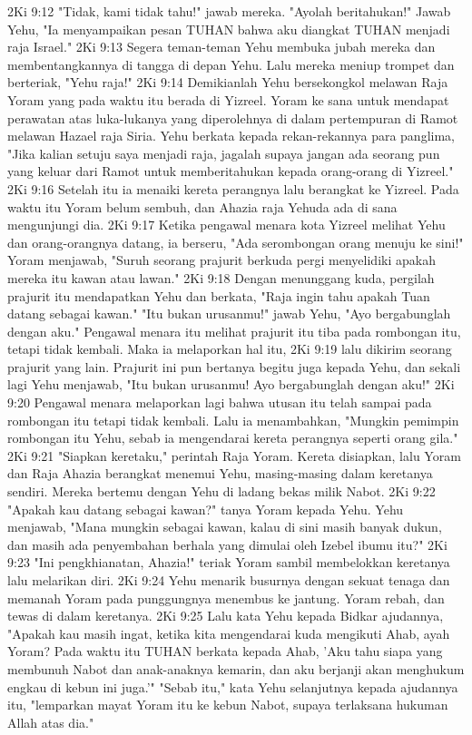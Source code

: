 2Ki 9:12  "Tidak, kami tidak tahu!" jawab mereka. "Ayolah beritahukan!" Jawab Yehu, "Ia menyampaikan pesan TUHAN bahwa aku diangkat TUHAN menjadi raja Israel."
2Ki 9:13  Segera teman-teman Yehu membuka jubah mereka dan membentangkannya di tangga di depan Yehu. Lalu mereka meniup trompet dan berteriak, "Yehu raja!"
2Ki 9:14  Demikianlah Yehu bersekongkol melawan Raja Yoram yang pada waktu itu berada di Yizreel. Yoram ke sana untuk mendapat perawatan atas luka-lukanya yang diperolehnya di dalam pertempuran di Ramot melawan Hazael raja Siria. Yehu berkata kepada rekan-rekannya para panglima, "Jika kalian setuju saya menjadi raja, jagalah supaya jangan ada seorang pun yang keluar dari Ramot untuk memberitahukan kepada orang-orang di Yizreel."
2Ki 9:16  Setelah itu ia menaiki kereta perangnya lalu berangkat ke Yizreel. Pada waktu itu Yoram belum sembuh, dan Ahazia raja Yehuda ada di sana mengunjungi dia.
2Ki 9:17  Ketika pengawal menara kota Yizreel melihat Yehu dan orang-orangnya datang, ia berseru, "Ada serombongan orang menuju ke sini!" Yoram menjawab, "Suruh seorang prajurit berkuda pergi menyelidiki apakah mereka itu kawan atau lawan."
2Ki 9:18  Dengan menunggang kuda, pergilah prajurit itu mendapatkan Yehu dan berkata, "Raja ingin tahu apakah Tuan datang sebagai kawan." "Itu bukan urusanmu!" jawab Yehu, "Ayo bergabunglah dengan aku." Pengawal menara itu melihat prajurit itu tiba pada rombongan itu, tetapi tidak kembali. Maka ia melaporkan hal itu,
2Ki 9:19  lalu dikirim seorang prajurit yang lain. Prajurit ini pun bertanya begitu juga kepada Yehu, dan sekali lagi Yehu menjawab, "Itu bukan urusanmu! Ayo bergabunglah dengan aku!"
2Ki 9:20  Pengawal menara melaporkan lagi bahwa utusan itu telah sampai pada rombongan itu tetapi tidak kembali. Lalu ia menambahkan, "Mungkin pemimpin rombongan itu Yehu, sebab ia mengendarai kereta perangnya seperti orang gila."
2Ki 9:21  "Siapkan keretaku," perintah Raja Yoram. Kereta disiapkan, lalu Yoram dan Raja Ahazia berangkat menemui Yehu, masing-masing dalam keretanya sendiri. Mereka bertemu dengan Yehu di ladang bekas milik Nabot.
2Ki 9:22  "Apakah kau datang sebagai kawan?" tanya Yoram kepada Yehu. Yehu menjawab, "Mana mungkin sebagai kawan, kalau di sini masih banyak dukun, dan masih ada penyembahan berhala yang dimulai oleh Izebel ibumu itu?"
2Ki 9:23  "Ini pengkhianatan, Ahazia!" teriak Yoram sambil membelokkan keretanya lalu melarikan diri.
2Ki 9:24  Yehu menarik busurnya dengan sekuat tenaga dan memanah Yoram pada punggungnya menembus ke jantung. Yoram rebah, dan tewas di dalam keretanya.
2Ki 9:25  Lalu kata Yehu kepada Bidkar ajudannya, "Apakah kau masih ingat, ketika kita mengendarai kuda mengikuti Ahab, ayah Yoram? Pada waktu itu TUHAN berkata kepada Ahab, 'Aku tahu siapa yang membunuh Nabot dan anak-anaknya kemarin, dan aku berjanji akan menghukum engkau di kebun ini juga.'" "Sebab itu," kata Yehu selanjutnya kepada ajudannya itu, "lemparkan mayat Yoram itu ke kebun Nabot, supaya terlaksana hukuman Allah atas dia."
